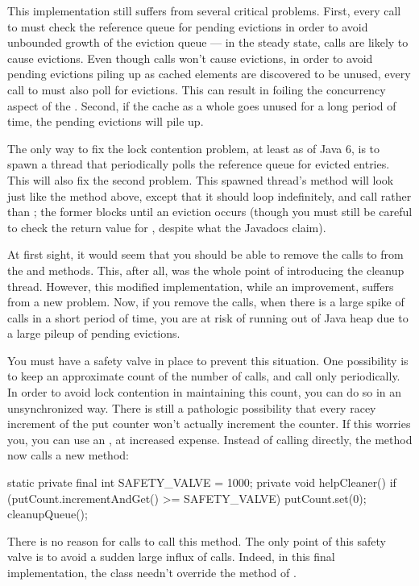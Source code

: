 This implementation still suffers from several critical problems. First, every
call to  must check the reference queue for pending evictions in order
to avoid unbounded growth of the eviction queue --- in the steady state,
 calls are likely to cause evictions. Even though  calls
won't cause evictions, in order to avoid pending evictions piling up as cached
elements are discovered to be unused, every call to  must also poll for
evictions. This can result in foiling the concurrency aspect of the
. Second, if the cache as a whole goes unused for a long
period of time, the pending evictions will pile up.

The only way to fix the lock contention problem, at least as of Java 6, is to
spawn a thread that periodically polls the reference queue for evicted entries.
This will also fix the second problem. This spawned thread's  method
will look just like the  method above, except that it should
loop indefinitely, and call  rather than ;
the former blocks until an eviction occurs (though you must still be careful to
check the return value for , despite what the Javadocs claim).

At first sight, it would seem that you should be able to remove the calls to
 from the  and  methods. This, after all,
was the whole point of introducing the cleanup thread. However, this modified
implementation, while an improvement, suffers from a new problem. Now, if you
remove the  calls, when there is a large spike of 
calls in a short period of time, you are at risk of running out of Java heap due
to a large pileup of pending evictions.

You must have a safety valve in place to prevent this situation. One possibility
is to keep an approximate count of the number of  calls, and call
 only periodically. In order to avoid lock contention in
maintaining this count, you can do so in an unsynchronized way. There is still a
pathologic possibility that every racey increment of the put counter won't
actually increment the counter. If this worries you, you can use an
, at increased expense. Instead of calling
 directly, the  method now calls a new
 method:
\begin{shortlisting}
   static private final int SAFETY_VALVE = 1000;
   private void helpCleaner() {
      if (putCount.incrementAndGet() >= SAFETY_VALVE) {
         putCount.set(0);
         cleanupQueue();
      }
   }
\end{shortlisting}
There is no reason for  calls to call this method. The only point of
this safety valve is to avoid a sudden large influx of  calls. Indeed,
in this final implementation, the  class needn't override
the  method of .

